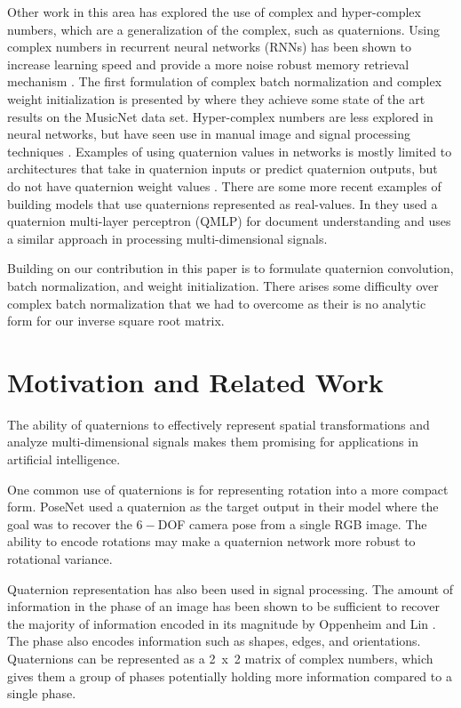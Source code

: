 \documentclass[14pt,a4paper]{article}
\begin{document}
Other work in this area has explored the use of complex and hyper-complex numbers, which are a generalization of the complex, such as quaternions.
Using complex numbers in recurrent neural networks (RNNs) has been shown to increase learning speed and provide a more noise robust memory retrieval mechanism \cite{arjovsky2016unitary, danihelka2016associative, wisdom2016full}.
The first formulation of complex batch normalization and complex weight initialization is presented by \cite{trabelsi2017deep} where they achieve some state of the art results on the MusicNet data set.
Hyper-complex numbers are less explored in neural networks, but have seen use in manual image and signal processing techniques \cite{bulow1999hypercomplex, sangwine2000colour, bulow2001hypercomplex}.
Examples of using quaternion values in networks is mostly limited to architectures that take in quaternion inputs or predict quaternion outputs, but do not have quaternion weight values \cite{rishiyur2006neural, kendall2015posenet}. 
There are some more recent examples of building models that use quaternions represented as real-values. 
In \cite{parcollet2016quaternion} they used a quaternion multi-layer perceptron (QMLP) for document understanding and \cite{minemoto2017feed} uses a similar approach in processing multi-dimensional signals. 

Building on \cite{trabelsi2017deep} our contribution in this paper is to formulate quaternion convolution, batch normalization, and weight initialization.
There arises some difficulty over complex batch normalization that we had to overcome as their is no analytic form for our inverse square root matrix.

\section{Motivation and Related Work}
The ability of quaternions to effectively represent spatial transformations and analyze multi-dimensional signals makes them promising for applications in artificial intelligence.

One common use of quaternions is for representing rotation into a more compact form. 
PoseNet \cite{kendall2015posenet} used a quaternion as the target output in their model where the goal was to recover the $6-$DOF camera pose from a single RGB image.
The ability to encode rotations may make a quaternion network more robust to rotational variance.

Quaternion representation has also been used in signal processing.  
The amount of information in the phase of an image has been shown to be sufficient to recover the majority of information encoded in its magnitude by Oppenheim and Lin \cite{oppenheim1981importance}.
The phase also encodes information such as shapes, edges, and orientations.
Quaternions can be represented as a 2~x~2 matrix of complex numbers, which gives them a group of phases potentially holding more information compared to a single phase.
\end{document}
